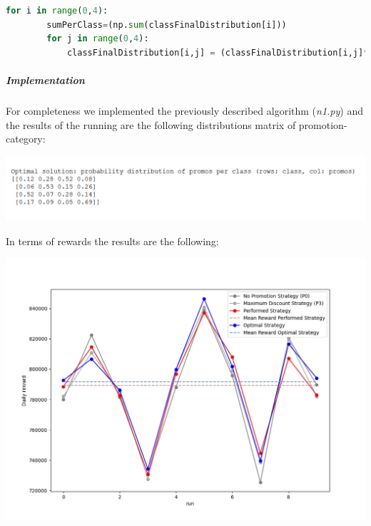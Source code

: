 \begin{enumerate}
	\begin{lstlisting}[basicstyle=\tiny\tt, tabsize=2, language=Python]
	for i in range(0,4):
		sumPerClass=(np.sum(classFinalDistribution[i]))
		for j in range(0,4):
			classFinalDistribution[i,j] = (classFinalDistribution[i,j]*100/sumPerClass)/100 
	\end{lstlisting}	
\end{enumerate}
\subparagraph*{Implementation} For completeness we implemented the previously described algorithm (\textit{n1.py}) and the results of the running are the following distributions matrix of promotion-category:
\begin{center}
	\includegraphics[scale=0.9]{Images/n1_results}
\end{center}
In terms of rewards the results are the following: 
\begin{center}
	\includegraphics[scale=0.6]{Images/n1_chart}
\end{center}






